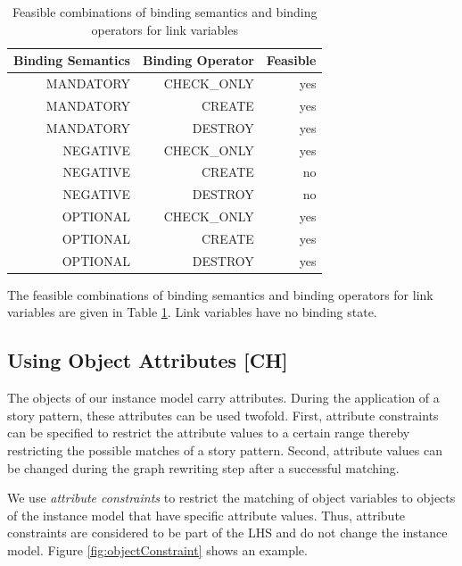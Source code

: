 

\begin{table}[htbp]
  \centering
  \caption{Feasible combinations of binding semantics and
  binding operators for link variables}
    \begin{tabular}{|r|r|r|}
    \hline
    \textbf{Binding Semantics} & \textbf{Binding
    Operator} & \textbf{Feasible} \\
    \hline
    MANDATORY & CHECK\_ONLY & yes \\
    MANDATORY & CREATE & yes \\
    MANDATORY & DESTROY & yes \\
    NEGATIVE & CHECK\_ONLY & yes \\
    NEGATIVE & CREATE & no \\
    NEGATIVE & DESTROY & no \\
    OPTIONAL & CHECK\_ONLY & yes \\
    OPTIONAL & CREATE & yes \\
    OPTIONAL & DESTROY & yes \\
    \hline
    \end{tabular}%
  \label{tab:bindingCombinations_links}%
\end{table}%

The feasible combinations of binding semantics and binding operators for link
variables are given in Table \ref{tab:bindingCombinations_links}. Link variables
have no binding state.


\subsection{Using Object Attributes [CH]}
\label{sec:StoryPatterns:attributes}

The objects of our instance model carry attributes. 
During the application of a story pattern, these attributes can be used twofold. 
First, attribute constraints can be specified to restrict the attribute values to a certain range thereby restricting the possible matches of a story pattern. 
Second, attribute values can be changed during the graph rewriting step after a successful matching.

We use \emph{attribute constraints} to restrict the matching of object variables to objects of the instance model that have specific attribute values. 
Thus, attribute constraints are considered to be part of the LHS and do not change the instance model. 
Figure \ref{fig:objectConstraint} shows an example.

